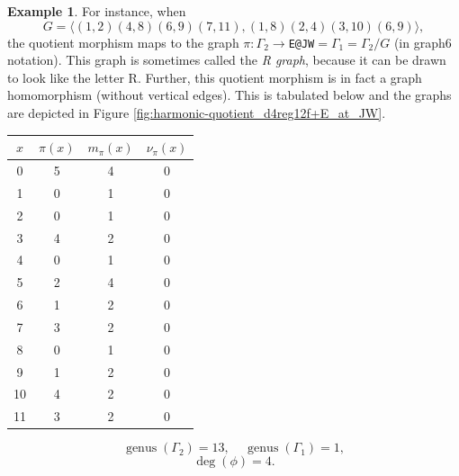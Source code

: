 \documentclass[12pt,letterpaper]{article}
\theoremstyle{definition}
\newtheorem{example}[theorem]{Example}
\DeclareMathOperator{\genus}{genus}
\begin{document}
\begin{example}
{For instance, when
\[
G = \langle (1,2)(4,8)(6,9)(7,11), (1,8)(2,4)(3,10)(6,9) \rangle ,
\]
the quotient morphism maps to the graph
$\pi: \Gamma_2\to $\verb+E@JW+$=\Gamma_1=\Gamma_2/G $ (in graph6 notation). This graph is sometimes called the {\it R graph},
because it can be drawn to look like the letter R.
Further, this quotient morphism is in fact a graph homomorphism
(without vertical edges).
This is tabulated below and the graphs are depicted in
Figure \ref{fig:harmonic-quotient_d4reg12f+E_at_JW}.

\begin{center}
\begin{tabular}{c|c|c|c}  
  $x$ & $\pi(x)$ & $m_\pi(x)$ & $\nu_\pi(x)$   \\ \hline
  0   &    5   &        4         &  0  \\ 
  1   &    0   &        1         &  0  \\ 
  2   &    0   &        1         &  0  \\ 
  3   &    4   &        2         &  0   \\
  4   &    0   &        1         &  0   \\
  5   &    2   &        4         &  0   \\
  6   &    1   &        2         &  0   \\
  7   &    3   &        2         &  0   \\
  8   &    0   &        1         &  0   \\
  9   &    1   &        2         &  0  \\   
  10  &    4  &         2         &  0  \\
  11  &    3   &        2         &  0  \\  
\end{tabular}
\end{center}

\[
  \genus(\Gamma_2) =13,\ \ \ \ \
  \genus(\Gamma_1) =1,
\]
\[
\deg(\phi) =4.
\]

}
\end{example}
\end{document}
